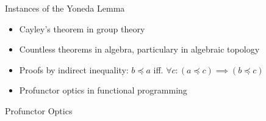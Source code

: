 \begin{frame}{Instances of the Yoneda Lemma}
\begin{itemize}
 \item Cayley's theorem in group theory
 \item Countless theorems in algebra, particulary in algebraic topology
 \item Proofs by indirect inequality: $b \preceq a$ iff. $\forall c : (a \preceq c) \implies (b \preceq c)$
 \item Profunctor optics in functional programming
\end{itemize}

\end{frame}
\begin{frame}{Profunctor Optics}
\end{frame}
